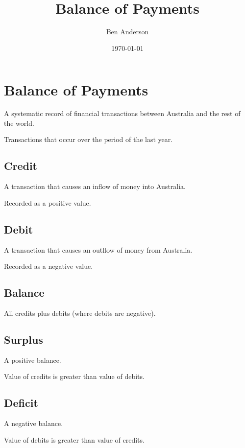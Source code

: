 \documentclass[a4paper,11pt]{article}
\begin{document}
\title{Balance of Payments}
\author{Ben Anderson}
\date{\today}
\maketitle
\pagebreak

\tableofcontents
\pagebreak


\section{Balance of Payments}

A systematic record of financial transactions between Australia and the rest of
the world.

Transactions that occur over the period of the last year.


\subsection{Credit}

A transaction that causes an inflow of money into Australia.

Recorded as a positive value.


\subsection{Debit}

A transaction that causes an outflow of money from Australia.

Recorded as a negative value.


\subsection{Balance}

All credits plus debits (where debits are negative).


\subsection{Surplus}

A positive balance.

Value of credits is greater than value of debits.


\subsection{Deficit}

A negative balance.

Value of debits is greater than value of credits.
\end{document}
